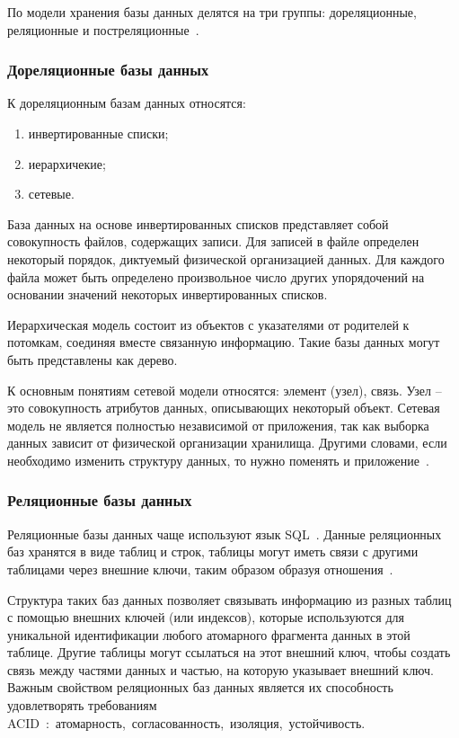 По модели хранения базы данных делятся на три группы: дореляционные, реляционные и постреляционные~\cite{Date}. 

\subsubsection{Дореляционные базы данных}

К дореляционным базам данных относятся:

\begin{enumerate}[label*=---]
	\item инвертированные списки;
	\item иерархичекие;
	\item сетевые.
\end{enumerate}

База данных на основе инвертированных списков представляет собой совокупность файлов, содержащих записи. Для записей в файле определен некоторый порядок, диктуемый физической организацией данных. Для каждого файла может быть определено произвольное число других упорядочений на основании значений некоторых инвертированных списков. 

Иерархическая модель  состоит из объектов с указателями от родителей к потомкам, соединяя вместе связанную информацию. Такие базы данных могут быть представлены как дерево.

К основным понятиям сетевой модели относятся: элемент (узел), связь. Узел -- это совокупность атрибутов данных, описывающих некоторый объект. Сетевая модель не является полностью независимой от приложения, так как выборка данных зависит от физической организации хранилища. Другими словами, если необходимо изменить структуру данных, то нужно поменять и приложение~\cite{Begg}.

\subsubsection{Реляционные базы данных}

Реляционные базы данных чаще используют язык SQL~\cite{oracle}. Данные реляционных баз хранятся в виде таблиц и строк, таблицы могут иметь связи с другими таблицами через внешние ключи, таким образом образуя отношения~\cite{sql}. 

Структура таких баз данных позволяет связывать информацию из разных таблиц с помощью внешних ключей (или индексов), которые используются для уникальной идентификации любого атомарного фрагмента данных в этой таблице. Другие таблицы могут ссылаться на этот внешний ключ, чтобы создать связь между частями данных и частью, на которую указывает внешний ключ. Важным свойством реляционных баз данных является их способность удовлетворять требованиям ACID~\cite{acid}:~атомарность,~согласованность,~изоляция,~устойчивость.

